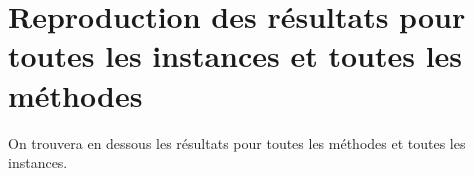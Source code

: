 \documentclass{article}
\begin{document}
\section{Reproduction des résultats pour toutes les instances et toutes les méthodes}
On trouvera en dessous les résultats pour toutes les méthodes et toutes les instances.







\end{document}
